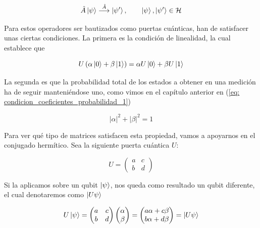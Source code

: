 \documentclass{article}
\numberwithin{equation}{section} %
\begin{document}
    \begin{equation*}
        \hat{A} \ket{\psi} \overset{\hat{A}}{\longrightarrow} \ket{\psi '}, \qquad \ket{\psi}, \ket{\psi '} \in \mathcal{H}
    \end{equation*}

    \vspace{2.5mm}

    Para estos operadores ser bautizados como puertas cuánticas, han de satisfacer unas ciertas condiciones. La primera es la condición de linealidad, la cual establece que

    \begin{equation}
        U \left( \alpha \ket{0} + \beta \ket{1} \right) = \alpha U \ket{0} + \beta U \ket{1}
        \label{eq: linealidad_puertas_cuanticas}
    \end{equation}

    \vspace{2.5mm}

    La segunda es que la probabilidad total de los estados a obtener en una medición ha de seguir manteniéndose uno, como vimos en el capítulo anterior en (\ref{eq: condicion_coeficientes_probabilidad_1})

    \begin{equation*}
        | \alpha | ^ {2} + | \beta | ^ {2} = 1
    \end{equation*}

    \vspace{2.5mm}

    Para ver qué tipo de matrices satisfacen esta propiedad, vamos a apoyarnos en el conjugado hermítico. Sea la siguiente puerta cuántica \( U \):

    \begin{equation*}
        U = \begin{pmatrix}
            a & c \\
            b & d
        \end{pmatrix}
    \end{equation*}

    \vspace{2.5mm}

    Si la aplicamos sobre un qubit \( \ket{\psi} \), nos queda como resultado un qubit diferente, el cual denotaremos como \( \ket{U \psi} \)

    \begin{equation}
        U \ket{\psi} = \begin{pmatrix}
            a & c \\
            b & d
        \end{pmatrix} \begin{pmatrix}
            \alpha \\
            \beta
        \end{pmatrix} = \begin{pmatrix}
            a \alpha + c \beta \\
            b \alpha + d \beta
        \end{pmatrix} = \ket{U \psi}
    \label{eq: puerta_cuantica_vector_aplicado}
    \end{equation}
\end{document}
